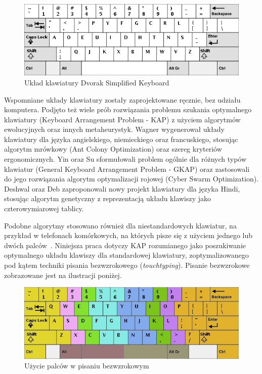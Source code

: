 \documentclass{xmgr}
\begin{document}
\begin{figure}[!tbh]
\centering
\includegraphics[width=.8\hsize]{fig/dvorak}
\caption{Układ klawiatury Dvorak Simplified Keyboard}
\end{figure}

Wspomniane układy klawiatury zostały zaprojektowane ręcznie, bez udziału komputera. Podjęto też wiele prób rozwiązania problemu szukania optymalnego klawiatury (Keyboard Arrangement Problem - KAP) z użyciem algorytmów ewolucyjnych oraz innych metaheurystyk. Wagner \cite{Eggers2003672} wygenerował układy klawiatury dla języka angielskiego, niemieckiego oraz francuskiego, stosując algorytm mrówkowy (Ant Colony Optimization) oraz szereg kryteriów ergonomicznych. Yin oraz Su \cite{Yin201143} sformułowali problem ogólnie dla różnych typów klawiatur (General Keyboard Arrangement Problem - GKAP) oraz zastosowali do jego rozwiązania algorytm optymalizacji rojowej (Cyber Swarm Optimization). Deshwal oraz Deb \cite{Hindi} zaproponowali nowy projekt klawiatury dla języka Hindi, stosując algorytm genetyczny z reprezentacją układu klawiszy jako czterowymiarowej tablicy.

Podobne algorytmy stosowano również dla niestandardowych klawiatur, na przykład w telefonach komórkowych, na których pisze się z użyciem jednego lub dwóch palców~\cite{Li2006695}. Niniejsza praca dotyczy KAP rozumianego jako poszukiwanie optymalnego układu klawiszy dla standardowej klawiatury, zoptymalizowanego pod kątem techniki pisania bezwzrokowego (\emph{touchtyping}). Pisanie bezwzrokowe zobrazowane jest na ilustracji poniżej.

\begin{figure}[!tbh]
\centering
\includegraphics[width=.8\hsize]{fig/touchtyping}
\caption{Użycie palców w pisaniu bezwzrokowym}
\end{figure}
\end{document}
